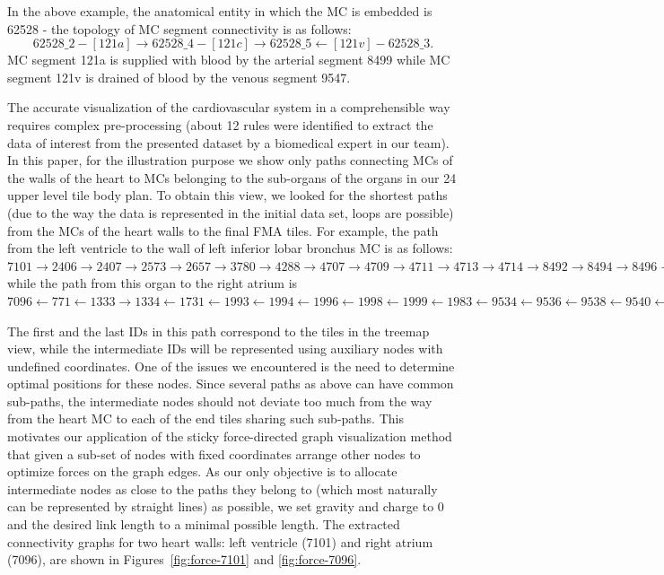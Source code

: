 In the above example, the anatomical entity in which the MC is embedded is 62528 - the topology of MC segment connectivity is as follows: 
$$62528\_2 - [121a] \rightarrow 62528\_4 - [121c] \rightarrow 62528\_5 \leftarrow [121v] - 62528\_3.$$
MC segment 121a is supplied with blood by the arterial segment 8499 while MC segment 121v is drained of blood by the venous segment 9547.

The accurate visualization of the cardiovascular system in a comprehensible way requires complex pre-processing (about 12 rules were identified to extract the data of interest from the presented dataset by a biomedical expert in our team).
In this paper, for the illustration purpose we show only paths connecting MCs of the walls of the heart to MCs belonging to the sub-organs of the organs in our 24 upper level tile body plan.
To obtain this view, we looked for the shortest paths (due to the way the data is represented in the initial data set, loops are possible) from the MCs of the heart walls to the final FMA tiles. For example, the path from the left ventricle to the wall of left inferior lobar bronchus MC is as follows:
$7101 \rightarrow 2406 \rightarrow 2407 \rightarrow 2573 \rightarrow 2657 \rightarrow 3780 \rightarrow 4288 \rightarrow 4707 \rightarrow 4709 \rightarrow 4711 \rightarrow 4713 \rightarrow 4714 \rightarrow 8492 \rightarrow 8494 \rightarrow 8496 \rightarrow 8498 \rightarrow 8499 \rightarrow 62528.$
while the path from this organ to the right atrium is
$7096 \leftarrow 771 \leftarrow 1333 \rightarrow 1334 \leftarrow 1731 \leftarrow 1993 \leftarrow 1994 \leftarrow 1996 \leftarrow 1998 \leftarrow 1999 \leftarrow 1983 \leftarrow 9534 \leftarrow 9536 \leftarrow 9538 \leftarrow 9540 \leftarrow 9542 \leftarrow 9544 \leftarrow 9546 \leftarrow 9547 \leftarrow 62528.$

The first and the last IDs in this path correspond to the tiles in the treemap view, while the intermediate IDs will be represented using auxiliary nodes with undefined coordinates. One of the issues we encountered is the need to determine optimal positions for these nodes. Since several paths as above can have common sub-paths, the intermediate nodes should not deviate too much from the way from the heart MC to each of the end tiles sharing such sub-paths. This motivates our application of the sticky force-directed graph visualization method that given a sub-set of nodes with fixed coordinates arrange other nodes to optimize forces on the graph edges. As our only objective is to allocate intermediate nodes as close to the paths they belong to (which most naturally can be represented by straight lines) as possible, we set gravity and charge to 0 and the desired link length to a minimal possible length. The extracted connectivity graphs for two heart walls: left ventricle (7101) and right atrium (7096), are shown in Figures~\ref{fig:force-7101} and \ref{fig:force-7096}.


